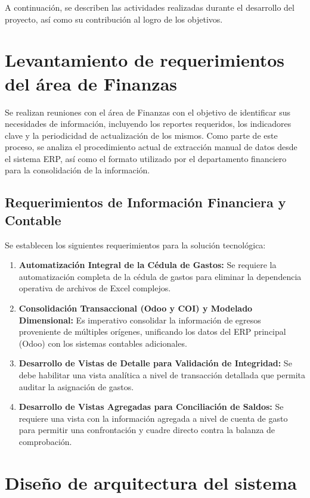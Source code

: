 A continuación, se describen las actividades realizadas durante el desarrollo del proyecto, así como su contribución al logro de los objetivos.

\section{Levantamiento de requerimientos del área de Finanzas}

Se realizan reuniones con el área de Finanzas con el objetivo de identificar sus necesidades de información, incluyendo los reportes requeridos, los indicadores clave y la periodicidad de actualización de los mismos. Como parte de este proceso, se analiza el procedimiento actual de extracción manual de datos desde el sistema ERP, así como el formato utilizado por el departamento financiero para la consolidación de la información.

\subsection{Requerimientos de Información Financiera y Contable}

Se establecen los siguientes requerimientos para la solución tecnológica:

\begin{enumerate}
    \item \textbf{Automatización Integral de la Cédula de Gastos:} Se requiere la automatización completa de la cédula de gastos para eliminar la dependencia operativa de archivos de Excel complejos.
    \item \textbf{Consolidación Transaccional (Odoo y COI) y Modelado Dimensional:} Es imperativo consolidar la información de egresos proveniente de múltiples orígenes, unificando los datos del ERP principal (Odoo) con los sistemas contables adicionales.
    \item \textbf{Desarrollo de Vistas de Detalle para Validación de Integridad:} Se debe habilitar una vista analítica a nivel de transacción detallada que permita auditar la asignación de gastos.
    \item \textbf{Desarrollo de Vistas Agregadas para Conciliación de Saldos:} Se requiere una vista con la información agregada a nivel de cuenta de gasto para permitir una confrontación y cuadre directo contra la balanza de comprobación.
\end{enumerate}

\section{Diseño de arquitectura del sistema}

